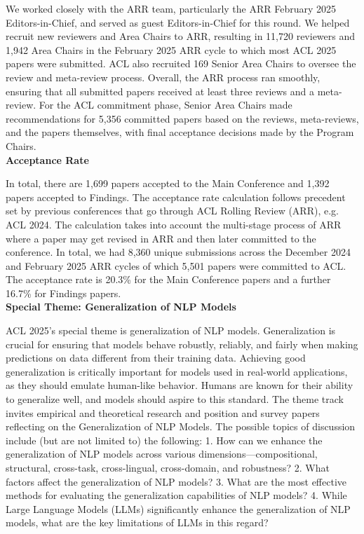 We worked closely with the ARR team, particularly the ARR February 2025 Editors-in-Chief, and served as guest Editors-in-Chief for this round. We helped recruit new reviewers and Area Chairs to ARR, resulting in 11,720 reviewers and 1,942 Area Chairs in the February 2025 ARR cycle to which most ACL 2025 papers were submitted. ACL also recruited 169 Senior Area Chairs to oversee the review and meta-review process. Overall, the ARR process ran smoothly, ensuring that all submitted papers received at least three reviews and a meta-review. For the ACL commitment phase, Senior Area Chairs made recommendations for 5,356 committed papers based on the reviews, meta-reviews, and the papers themselves, with final acceptance decisions made by the Program Chairs.\\

\textbf{Acceptance Rate}

In total, there are 1,699 papers accepted to the Main Conference and 1,392 papers accepted to Findings. The acceptance rate calculation follows precedent set by previous conferences that go through ACL Rolling Review (ARR), e.g. ACL 2024. The calculation takes into account the multi-stage process of ARR where a paper may get revised in ARR and then later committed to the conference. In total, we had 8,360 unique submissions across the December 2024 and February 2025 ARR cycles of which 5,501 papers were committed to ACL. The acceptance rate is 20.3\% for the Main Conference papers and a further 16.7\% for Findings papers.\\

\textbf{Special Theme: Generalization of NLP Models}

ACL 2025's special theme is generalization of NLP models. Generalization is crucial for ensuring that models behave robustly, reliably, and fairly when making predictions on data different from their training data. Achieving good generalization is critically important for models used in real-world applications, as they should emulate human-like behavior. Humans are known for their ability to generalize well, and models should aspire to this standard. The theme track invites empirical and theoretical research and position and survey papers reflecting on the Generalization of NLP Models. The possible topics of discussion include (but are not limited to) the following:
1. How can we enhance the generalization of NLP models across various dimensions—compositional, structural, cross-task, cross-lingual, cross-domain, and robustness?
2. What factors affect the generalization of NLP models?
3. What are the most effective methods for evaluating the generalization capabilities of NLP models?
4. While Large Language Models (LLMs) significantly enhance the generalization of NLP models, what are the key limitations of LLMs in this regard?


